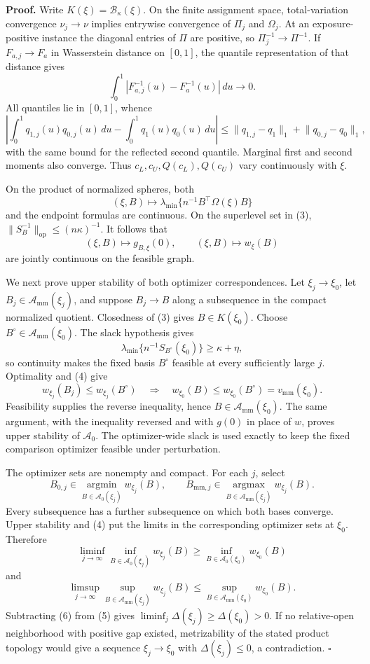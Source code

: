 \textbf{Proof.}
Write \(K(\xi)=\mathcal B_\kappa(\xi)\).  On the finite assignment space, total-variation convergence \(\nu_j\to\nu\) implies entrywise convergence of \(\Pi_j\) and \(\Omega_j\).  At an exposure-positive instance the diagonal entries of \(\Pi\) are positive, so \(\Pi_j^{-1}\to\Pi^{-1}\).  If \(F_{a,j}\to F_a\) in Wasserstein distance on \([0,1]\), the quantile representation of that distance gives
\[
\int_0^1|F_{a,j}^{-1}(u)-F_a^{-1}(u)|\,du\longrightarrow0.
\tag{1}
\]
All quantiles lie in \([0,1]\), whence
\[
\left|\int_0^1q_{1,j}(u)q_{0,j}(u)\,du-
\int_0^1q_1(u)q_0(u)\,du\right|
\le\lVert q_{1,j}-q_1\rVert_1+\lVert q_{0,j}-q_0\rVert_1,
\tag{2}
\]
with the same bound for the reflected second quantile.  Marginal first and second moments also converge.  Thus \(c_L,c_U,Q(c_L),Q(c_U)\) vary continuously with \(\xi\).

On the product of normalized spheres, both
\[
(\xi,B)\longmapsto\lambda_{\min}\{n^{-1}B^{\top}\Omega(\xi)B\}
\tag{3}
\]
and the endpoint formulas are continuous.  On the superlevel set in (3), \(\lVert S_B^{-1}\rVert_{\mathrm{op}}\le(n\kappa)^{-1}\).  It follows that
\[
(\xi,B)\longmapsto g_{B,\xi}(0),
\qquad
(\xi,B)\longmapsto w_\xi(B)
\tag{4}
\]
are jointly continuous on the feasible graph.

We next prove upper stability of both optimizer correspondences.  Let \(\xi_j\to\xi_0\), let \(B_j\in\mathcal A_{\mathrm{mm}}(\xi_j)\), and suppose \(B_j\to B\) along a subsequence in the compact normalized quotient.  Closedness of (3) gives \(B\in K(\xi_0)\).  Choose \(B^\circ\in\mathcal A_{\mathrm{mm}}(\xi_0)\).  The slack hypothesis gives
\[
\lambda_{\min}\{n^{-1}S_{B^\circ}(\xi_0)\}\ge\kappa+\eta,
\]
so continuity makes the fixed basis \(B^\circ\) feasible at every sufficiently large \(j\).  Optimality and (4) give
\[
w_{\xi_j}(B_j)\le w_{\xi_j}(B^\circ)
\quad\Longrightarrow\quad
w_{\xi_0}(B)\le w_{\xi_0}(B^\circ)=v_{\mathrm{mm}}(\xi_0).
\]
Feasibility supplies the reverse inequality, hence \(B\in\mathcal A_{\mathrm{mm}}(\xi_0)\).  The same argument, with the inequality reversed and with \(g(0)\) in place of \(w\), proves upper stability of \(\mathcal A_0\).  The optimizer-wide slack is used exactly to keep the fixed comparison optimizer feasible under perturbation.

The optimizer sets are nonempty and compact.  For each \(j\), select
\[
B_{0,j}\in\operatorname*{argmin}_{B\in\mathcal A_0(\xi_j)}w_{\xi_j}(B),
\qquad
B_{\mathrm{mm},j}\in\operatorname*{argmax}_{B\in\mathcal A_{\mathrm{mm}}(\xi_j)}w_{\xi_j}(B).
\]
Every subsequence has a further subsequence on which both bases converge.  Upper stability and (4) put the limits in the corresponding optimizer sets at \(\xi_0\).  Therefore
\[
\liminf_{j\to\infty}\inf_{B\in\mathcal A_0(\xi_j)}w_{\xi_j}(B)
\ge\inf_{B\in\mathcal A_0(\xi_0)}w_{\xi_0}(B)
\tag{5}
\]
and
\[
\limsup_{j\to\infty}\sup_{B\in\mathcal A_{\mathrm{mm}}(\xi_j)}w_{\xi_j}(B)
\le\sup_{B\in\mathcal A_{\mathrm{mm}}(\xi_0)}w_{\xi_0}(B).
\tag{6}
\]
Subtracting (6) from (5) gives \(\liminf_j\Delta(\xi_j)\ge\Delta(\xi_0)>0\).  If no relative-open neighborhood with positive gap existed, metrizability of the stated product topology would give a sequence \(\xi_j\to\xi_0\) with \(\Delta(\xi_j)\le0\), a contradiction. \(\square\)